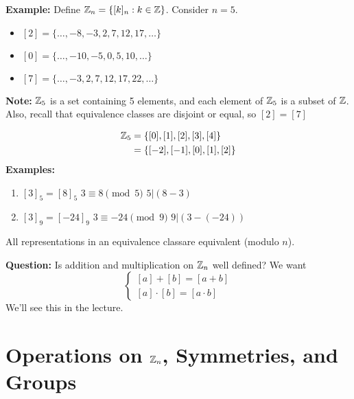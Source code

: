 \documentclass[openany]{report}
\begin{document}
\textbf{Example:} Define $\mathbb{Z}_n = \{[k]_n: k\in \mathbb{Z}\}$. Consider $n = 5$.
\begin{itemize}
    \item $[2] = \{\ldots, -8,-3,2,7,12,17,\ldots\}$
    \item $[0] = \{\ldots, -10,-5,0,5,10,\ldots\}$
    \item $[7] = \{\ldots, -3,2, 7,12,17,22,\ldots\}$
\end{itemize}
\begin{center}
    \textbf{Note:} $\mathbb{Z}_5$ is a set containing 5 elements, and each element of $\mathbb{Z}_5$ is a subset of $\mathbb{Z}$. Also, recall that equivalence classes are disjoint or equal, so $[2] = [7]$
\end{center}
\begin{align*}
    \mathbb{Z}_5 &= \{[0],[1],[2],[3],[4]\}\\
            &= \{[-2],[-1],[0],[1],[2]\}\\
\end{align*}
\textbf{Examples:}
\begin{enumerate}[label=(\alph*)]
    \item $[3]_5 = [8]_5$ $3 \equiv 8 \pmod{5}$ $5 | (8-3)$
    \item $[3]_9 = [-24]_9$ $3 \equiv -24 \pmod{9}$ $9 | (3- (-24))$
\end{enumerate}
\begin{center}
    All representations in an equivalence classare equivalent (modulo $n$).
\end{center}
\noindent
\textbf{Question:} Is addition and multiplication on $\mathbb{Z}_n$ well defined? We want
\[\begin{cases}
    [a] + [b] = [a+b]\\
    [a] \cdot [b] = [a \cdot b]
\end{cases}\]
We'll see this in the lecture. 

\chapter{Operations on $\mathbb{Z}_n$, Symmetries, and Groups}
\end{document}
